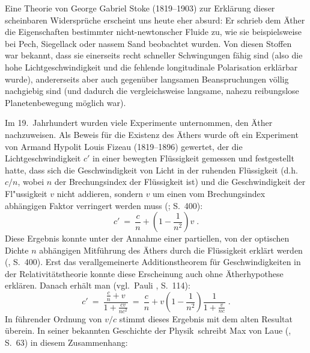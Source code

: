 Eine Theorie von George Gabriel Stoke (1819--1903) zur Erkl\"arung dieser
scheinbaren Widerspr\"uche erscheint uns heute eher absurd: 
Er schrieb dem
\"Ather die Eigenschaften bestimmter nicht-newtonscher Fluide zu, wie
sie beispielsweise bei Pech, Siegellack oder nassem Sand beobachtet 
wurden. Von diesen Stoffen war bekannt, dass sie einerseits recht 
schneller Schwingungen f\"ahig sind (also die hohe Lichtgeschwindigkeit 
und die fehlende longitudinale Polarisation erkl\"arbar wurde), andererseits
aber auch gegen\"uber langsamen Beanspruchungen v\"ollig nachgiebig
sind (und dadurch die vergleichsweise langsame, nahezu reibungslose 
Planetenbewegung m\"oglich war). 

Im 19.\ Jahrhundert wurden viele Experimente unternommen, den
\"Ather nachzuweisen. Als Beweis f\"ur die Existenz des
\"Athers wurde oft ein Experiment von 
Armand Hypolit Louis Fizeau (1819--1896) gewertet, der die 
Lichtgeschwindigkeit $c'$ in einer bewegten Fl\"ussigkeit gemessen
und festgestellt hatte, dass sich die Geschwindigkeit von Licht
in der ruhenden Fl\"ussigkeit (d.h.\ $c/n$, wobei $n$ der Brechungsindex
der Fl\"ussigkeit ist) und die Geschwindigkeit der Fl"ussigkeit $v$
nicht addieren, sondern $v$ um einen vom Brechungsindex abh\"angigen
Faktor verringert werden muss  (\cite{Simonyi}; S.~400):
\begin{equation}
    c' ~=~ \frac{c}{n} + \left( 1 - \frac{1}{n^2} \right) v \;. 
\end{equation}
Diese Ergebnis konnte unter der Annahme einer partiellen,
von der optischen Dichte $n$ abh\"angigen Mitf\"uhrung
des \"Athers durch die Fl\"ussigkeit erkl\"art werden (\cite{Simonyi},
S.~400).
Erst das verallgemeinerte Additionstheorem
f\"ur Geschwindigkeiten in der Relativit\"atstheorie konnte
diese Erscheinung auch ohne \"Atherhypothese erkl\"aren. Danach erh\"alt
man (vgl.\ Pauli \cite{Pauli}, S.~114):
\begin{equation}
\label{eq_Fizeau}
      c' ~=~ \frac{\frac{c}{n} + v}{1 + \frac{cv}{nc^2}}  ~=~
       \frac{c}{n} + v \left( 1 - \frac{1}{n^2} \right) 
                      \frac{1}{1 + \frac{v}{nc}}   \;. 
\end{equation}                      
In f\"uhrender Ordnung von $v/c$ stimmt dieses Ergebnis mit dem alten 
Resultat \"uberein. In seiner bekannten \glqq Geschichte der Physik\grqq\
schreibt Max von Laue (\cite{Laue}, S.~63) in diesem Zusammenhang:
\vspace{0.3cm}

